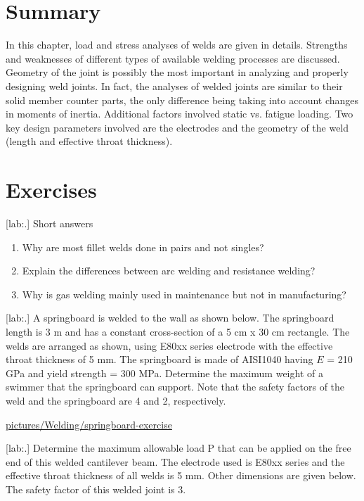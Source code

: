 \documentclass[a4paper,openany,12pt]{book}
\begin{document}
{{\section{Summary}
\label{sec:org60e6e64}
In this chapter, load and stress analyses of welds are given in details.
Strengths and weaknesses of different types of available welding
processes are discussed. Geometry of the joint is possibly the most
important in analyzing and properly designing weld joints. In fact, the
analyses of welded joints are similar to their solid member counter
parts, the only difference being taking into account changes in moments
of inertia. Additional factors involved static vs. fatigue loading. Two
key design parameters involved are the electrodes and the geometry of
the weld (length and effective throat thickness).

\section{Exercises}
\label{sec:orgaa2e140}
[lab:.] Short answers

\begin{enumerate}
\item Why are most fillet welds done in pairs and not singles?

\item Explain the differences between arc welding and resistance welding?

\item Why is gas welding mainly used in maintenance but not in
manufacturing?
\end{enumerate}

[lab:.] A springboard is welded to
the wall as shown below. The springboard length is 3 m and has a
constant cross-section of a 5 cm x 30 cm rectangle. The welds are
arranged as shown, using E80xx series electrode with the effective
throat thickness of 5 mm. The springboard is made of AISI1040 having \(E\)
= 210 GPa and yield strength = 300 MPa. Determine the maximum weight of
a swimmer that the springboard can support. Note that the safety factors
of the weld and the springboard are 4 and 2, respectively.


\url{pictures/Welding/springboard-exercise}

[lab:.] Determine the maximum
allowable load P that can be applied on the free end of this welded
cantilever beam. The electrode used is E80xx series and the effective
throat thickness of all welds is 5 mm. Other dimensions are given below.
The safety factor of this welded joint is 3.


}}
\end{document}
